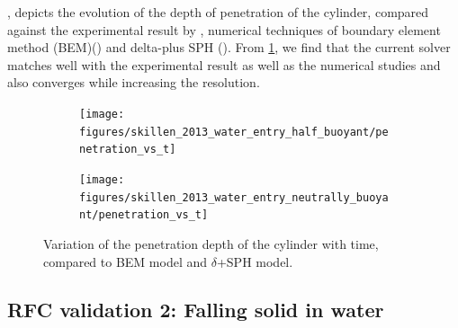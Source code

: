 \documentclass[preprint,12pt]{elsarticle}
\begin{document}
, depicts the evolution of the
depth of penetration of the cylinder, compared against the experimental result
by \citet{greenhow1983nonlinear}, numerical techniques of boundary element
method (BEM)(\cite{sun2006water}) and delta-plus SPH
(\cite{sun2018accurate}). From \cref{fig:result_rfc_01_result_displacement},
we find that the current solver matches well with the experimental result as
well as the numerical studies and also converges while increasing the
resolution.
\begin{figure}[!htpb]
  \centering
  \begin{subfigure}{0.48\textwidth}
    \centering
    \texttt{[image: figures/skillen\_2013\_water\_entry\_half\_buoyant/penetration\_vs\_t]}
  \end{subfigure}
  \begin{subfigure}{0.48\textwidth}
    \centering
    \texttt{[image: figures/skillen\_2013\_water\_entry\_neutrally\_buoyant/penetration\_vs\_t]}
  \end{subfigure}
  \caption{Variation of the penetration depth of the cylinder with time,
    compared to BEM model \cite{sun2006water} and $\delta$+SPH model\cite{sun2018accurate}.}
\label{fig:result_rfc_01_result_displacement}
\end{figure}


\FloatBarrier%
\subsection{RFC validation 2: Falling solid in water}
\label{sec:rfc_validation_2_falling_solid_in_water}
\end{document}
